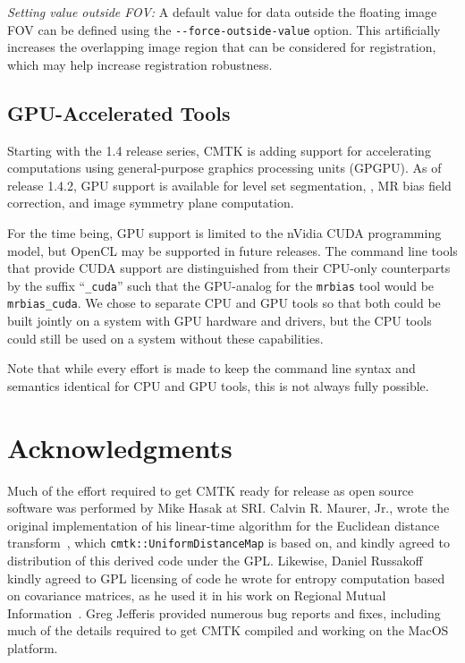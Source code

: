 \documentclass{InsightArticle}
\begin{document}
{\em Setting value outside FOV:\/} A default value for data outside the
floating image FOV can be defined using the \verb|--force-outside-value|
option. This artificially increases the overlapping image region that can be
considered for registration, which may help increase registration robustness. 


\subsection{GPU-Accelerated Tools}

Starting with the 1.4 release series, CMTK is adding support for accelerating
computations using general-purpose graphics processing units (GPGPU). As of
release 1.4.2, GPU support is available for level set segmentation,
, MR bias field correction, and image symmetry
plane computation.

For the time being, GPU support is limited to the nVidia CUDA programming
model, but OpenCL may be supported in future releases. 
 The command line tools that provide CUDA support are
distinguished from their CPU-only counterparts by the suffix ``{\tt \_cuda}''
such that the GPU-analog for the {\tt mrbias} tool would be {\tt
  mrbias\_cuda}. We chose to separate CPU and GPU tools so that both could be
built jointly on a system with GPU hardware and drivers, but the CPU tools
could still be used on a system without these capabilities.

Note that while every effort is made to keep the command line syntax and
semantics identical for CPU and GPU tools, this is not always fully possible.

\clearpage
\section*{Acknowledgments}

Much of the effort required to get CMTK ready for release as open source
software was performed by Mike Hasak at SRI. Calvin R. Maurer, Jr., wrote the
original implementation of his linear-time algorithm for the Euclidean
distance transform~\cite{MaurQiRagh:2003}, which
\verb|cmtk::UniformDistanceMap| is based on, and kindly agreed to distribution
of this derived code under the GPL. Likewise, Daniel Russakoff kindly agreed
to GPL licensing of code he wrote for entropy computation based on covariance
matrices, as he used it in his work on Regional Mutual
Information~\cite{RussTomaRohl:2004}. Greg Jefferis provided numerous bug
reports and fixes, including much of the details required to get CMTK compiled
and working on the MacOS platform.

%
%




\printindex
\end{document}
